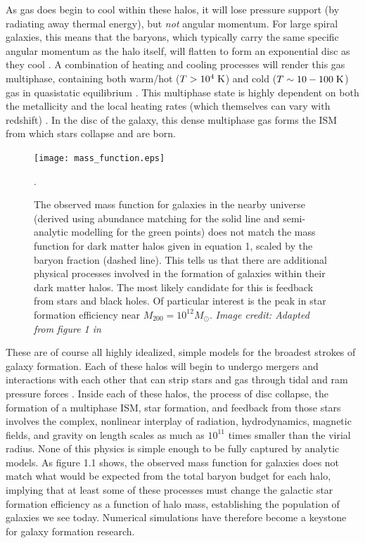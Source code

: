As gas does begin to cool within these halos, it will lose pressure support (by
radiating away thermal energy), but {\it not} angular momentum.  For large
spiral galaxies, this means that the baryons, which typically carry the same
specific angular momentum as the halo itself, will flatten to form an
exponential disc as they cool \citep{Fall1980,Mo1998}.    A combination
of heating and cooling processes will render this gas multiphase, containing
both warm/hot ($T>10^4\;\rm{K}$) and cold ($T\sim10-100\;\rm{K}$) gas in
quasistatic equilibrium \citep{McKee1977}.  This multiphase state is highly
dependent on both the metallicity and the local heating rates (which
themselves can vary with redshift) \citep{Field1969,Wolfire1995,Norman1997}.  In
the disc of the galaxy, this dense multiphase gas forms the ISM from which stars
collapse and are born.
\begin{figure}
    \texttt{[image: mass\_function.eps]}
    \caption[Galaxy mass function]{The observed mass function for galaxies in
    the nearby universe (derived using abundance matching for the solid line and
    semi-analytic modelling for the green points) does not match the mass
    function for dark matter halos given in equation 1, scaled by the baryon
    fraction (dashed line).  This tells us that there are additional physical
    processes involved in the formation of galaxies within their dark matter
    halos.  The most likely candidate for this is feedback from stars and black
    holes.  Of particular interest is the peak in star formation efficiency near
    $M_{200}=10^{12}M_\odot$.  \textit{Image credit: Adapted from figure 1 in
    \citet{Ferrero2012}}}.
\end{figure}

These are of course all highly idealized, simple models for the broadest strokes
of galaxy formation.  Each of these halos will begin to undergo mergers and
interactions \citet{Navarro1993,Kauffmann1999,Cole2000} with each other that can
strip stars and gas through tidal and ram pressure forces
\citep{Gunn1972,Dressler1980}.  Inside each of these halos, the process of disc
collapse, the formation of a multiphase ISM, star formation, and feedback from
those stars involves the complex, nonlinear interplay of radiation,
hydrodynamics, magnetic fields, and gravity on length scales as much as
$10^{11}$ times smaller than the virial radius.  None of this physics is simple
enough to be fully captured by analytic models. As figure 1.1 shows, the
observed mass function for galaxies does not match what would be expected from
the total baryon budget for each halo, implying that at least some of these
processes must change the galactic star formation efficiency as a function of
halo mass, establishing the population of galaxies we see today.  Numerical
simulations have therefore become a keystone for galaxy formation research.


